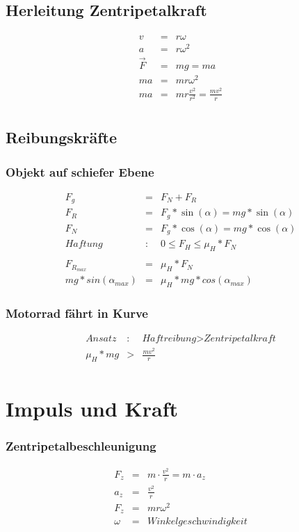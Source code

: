 \documentclass[11pt]{article}
\begin{document}
\subsection{Herleitung Zentripetalkraft}
\begin{eqnarray*}
v&=&r\omega\\
a&=&r\omega^2\\
\overrightarrow{F} &=& mg = ma\\
ma &=& mr\omega^2\\
ma &=& mr\frac{v^2}{r^2} = \frac{mv^2}{r}\\
\end{eqnarray*}
\subsection{Reibungskräfte}
\subsubsection{Objekt auf schiefer Ebene}
\begin{eqnarray*}
F_g &=& F_N + F_R\\
F_R &=& F_g * \sin(\alpha) = mg*\sin(\alpha)\\
F_N &=& F_g * \cos(\alpha) = mg*\cos(\alpha)\\
\textit{Haftung}&:& 0 \le F_H \le \mu_H * F_N\\\\
F_{R_{max}} &=& \mu_H * F_N\\
mg * sin(\alpha_{max}) &=& \mu_H * mg * cos(\alpha_{max})
\end{eqnarray*}
\subsubsection{Motorrad fährt in Kurve}
\begin{eqnarray*}
\textit{Ansatz}&:& \textit{Haftreibung} > \textit{Zentripetalkraft}\\
\mu_H * mg &>& \frac{mv^2}{r}\\
\end{eqnarray*}
\section{Impuls und Kraft}
\subsubsection{Zentripetalbeschleunigung}
\begin{eqnarray*}
F_z &=& m\cdot\frac{v^2}{r} = m \cdot a_z\\
a_z &=& \frac{v^2}{r}\\
F_z &=& mr\omega^2\\
\omega &=& \textit{Winkelgeschwindigkeit}
\end{eqnarray*}
\end{document}
